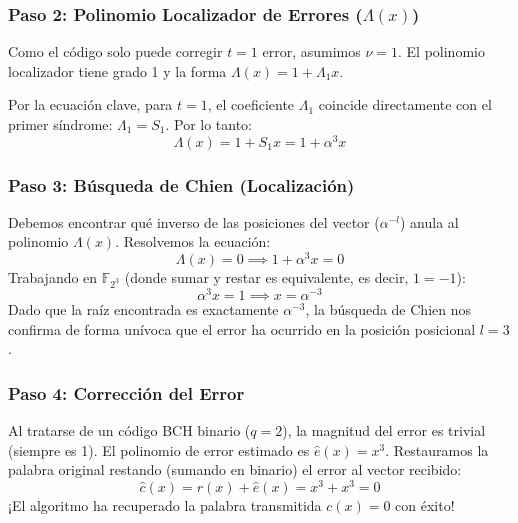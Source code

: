 \documentclass{article}
\begin{document}
\subsubsection{Paso 2: Polinomio Localizador de Errores ($\Lambda(x)$)}
Como el código solo puede corregir $t=1$ error, asumimos $\nu = 1$. El polinomio localizador tiene grado 1 y la forma $\Lambda(x) = 1 + \Lambda_1 x$. 

Por la ecuación clave, para $t=1$, el coeficiente $\Lambda_1$ coincide directamente con el primer síndrome: $\Lambda_1 = S_1$. Por lo tanto:
\[
\Lambda(x) = 1 + S_1 x = 1 + \alpha^3 x
\]

\subsubsection{Paso 3: Búsqueda de Chien (Localización)}
Debemos encontrar qué inverso de las posiciones del vector ($\alpha^{-l}$) anula al polinomio $\Lambda(x)$. Resolvemos la ecuación:
\[
\Lambda(x) = 0 \implies 1 + \alpha^3 x = 0
\]
Trabajando en $\mathbb{F}_{2^3}$ (donde sumar y restar es equivalente, es decir, $1 = -1$):
\[
\alpha^3 x = 1 \implies x = \alpha^{-3}
\]
Dado que la raíz encontrada es exactamente $\alpha^{-3}$, la búsqueda de Chien nos confirma de forma unívoca que el error ha ocurrido en la posición posicional $l = 3$.

\subsubsection{Paso 4: Corrección del Error}
Al tratarse de un código BCH binario ($q=2$), la magnitud del error es trivial (siempre es 1). El polinomio de error estimado es $\hat{e}(x) = x^3$. 
Restauramos la palabra original restando (sumando en binario) el error al vector recibido:
\[
\hat{c}(x) = r(x) + \hat{e}(x) = x^3 + x^3 = 0
\]
¡El algoritmo ha recuperado la palabra transmitida $c(x) = 0$ con éxito!
\end{document}
